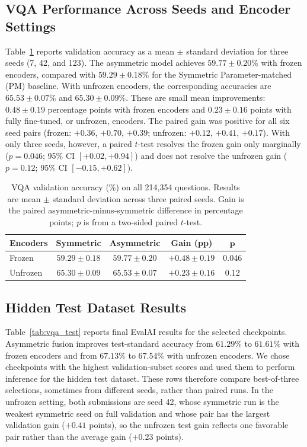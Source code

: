 \documentclass[conference]{IEEEtran}
\begin{document}
\subsection{VQA Performance Across Seeds and Encoder Settings}

Table~\ref{tab:vqa_answer_prediction} reports validation accuracy as a mean $\pm$ standard deviation for three seeds (7, 42, and 123). The asymmetric model achieves $59.77 \pm 0.20\%$ with frozen encoders, compared with $59.29 \pm 0.18\%$ for the Symmetric Parameter-matched (PM) baseline. With unfrozen encoders, the corresponding accuracies are $65.53 \pm 0.07\%$ and $65.30 \pm 0.09\%$. These are small mean improvements: $0.48 \pm 0.19$ percentage points with frozen encoders and $0.23 \pm 0.16$ points with fully fine-tuned, or unfrozen, encoders. The paired gain was positive for all six seed pairs (frozen: $+0.36$, $+0.70$, $+0.39$; unfrozen: $+0.12$, $+0.41$, $+0.17$). With only three seeds, however, a paired $t$-test resolves the frozen gain only marginally ($p=0.046$; 95\% CI $[+0.02,+0.94]$) and does not resolve the unfrozen gain ($p=0.12$; 95\% CI $[-0.15,+0.62]$).

\begin{table}[t]
\centering
\caption{VQA validation accuracy (\%) on all 214,354 questions. Results are mean $\pm$ standard deviation across three paired seeds. Gain is the paired asymmetric-minus-symmetric difference in percentage points; $p$ is from a two-sided paired $t$-test.}
\label{tab:vqa_answer_prediction}
\setlength{\tabcolsep}{3pt}
\renewcommand{\arraystretch}{1.05}
\begin{tabular}{lcccc}
\hline
\textbf{Encoders} & \textbf{Symmetric} & \textbf{Asymmetric} & \textbf{Gain (pp)} & $\boldsymbol{p}$\\
\hline
Frozen & $59.29\pm0.18$ & $59.77\pm0.20$ & $+0.48\pm0.19$ & 0.046\\
Unfrozen & $65.30\pm0.09$ & $65.53\pm0.07$ & $+0.23\pm0.16$ & 0.12\\
\hline
\end{tabular}
\end{table}

\subsection{Hidden Test Dataset Results}

Table~\ref{tab:vqa_test} reports final EvalAI results for the selected checkpoints. Asymmetric fusion improves test-standard accuracy from $61.29\%$ to $61.61\%$ with frozen encoders and from $67.13\%$ to $67.54\%$ with unfrozen encoders.  We chose checkpoints with the highest validation-subset scores and used them to perform inference for the hidden test dataset. These rows therefore compare best-of-three selections, sometimes from different seeds, rather than paired runs. In the unfrozen setting, both submissions are seed 42, whose symmetric run is the weakest symmetric seed on full validation and whose pair has the largest validation gain ($+0.41$ points), so the unfrozen test gain reflects one favorable pair rather than the average gain ($+0.23$ points).
\end{document}
